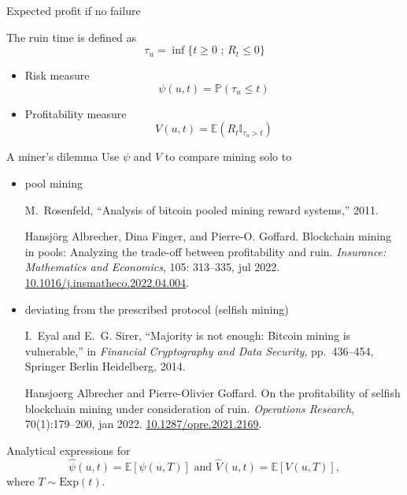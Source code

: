 \documentclass{beamer}
\begin{document}
\begin{frame}{Expected profit if no failure}
\scriptsize

The ruin time is defined as
$$
\tau_u  = \inf\{t\geq0\text{ ; }R_t \leq0\}
$$
\begin{itemize}
  \item Risk measure
  $$
  \psi(u,t) = \mathbb{P}(\tau_u \leq t)
  $$
  \item Profitability measure
  $$
  V(u,t) = \mathbb{E}(R_t\mathbb{I}_{\tau_u > t})
  $$
\end{itemize} 
\end{frame}
\begin{frame}{A miner's dilemma} 
\scriptsize
Use $\psi$ and $V$ to compare mining solo to
\begin{itemize}
  \item pool mining
\tiny
  \begin{thebibliography}{1}

M.~Rosenfeld, ``Analysis of bitcoin pooled mining reward systems,'' 2011.

Hansjörg Albrecher, Dina Finger, and Pierre-O. Goffard.
\newblock Blockchain mining in pools: Analyzing the trade-off between
  profitability and ruin.
\newblock \emph{Insurance: Mathematics and Economics}, 105: 313--335,
  jul 2022.
\newblock \url{10.1016/j.insmatheco.2022.04.004}.
\end{thebibliography}
  \item \scriptsize deviating from the prescribed protocol (selfish mining)

  \tiny
  \begin{thebibliography}{1}
I.~Eyal and E.~G. Sirer, ``Majority is not enough: Bitcoin mining is
  vulnerable,'' in {\em Financial Cryptography and Data Security},
  pp.~436--454, Springer Berlin Heidelberg, 2014.

Hansjoerg Albrecher and Pierre-Olivier Goffard.
\newblock On the profitability of selfish blockchain mining under consideration
  of ruin.
\newblock \emph{Operations Research}, 70(1):179--200, jan
  2022.
\newblock \url{10.1287/opre.2021.2169}.
\end{thebibliography}
\end{itemize}
Analytical expressions for 
$$
\widehat{\psi}(u,t)= \mathbb{E}[\psi(u,T)]\text{ and }\widehat{V}(u,t)= \mathbb{E}[V(u,T)],
$$
where $T\sim\text{Exp}(t)$.
\end{frame}
\end{document}
